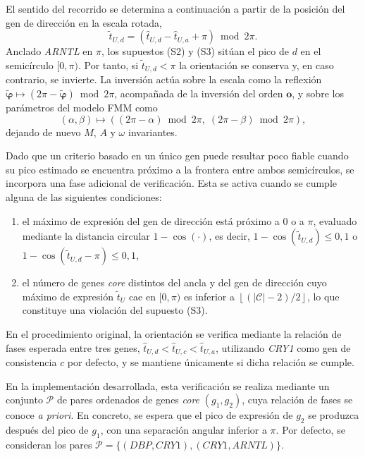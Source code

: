\documentclass[12pt, a4paper]{report}
\begin{document}
El sentido del recorrido se determina a continuación a partir de la posición del gen de dirección en la escala rotada,
\[
\widetilde{t}_{U,d}=\left(\widehat{t}_{U,d}-\widehat{t}_{U,a}+\pi\right)\bmod 2\pi .
\]
Anclado \textit{ARNTL} en \(\pi\), los supuestos (S2) y (S3) sitúan el pico de \(d\) en el semicírculo \([0,\pi)\). Por tanto, si \(\widetilde{t}_{U,d}<\pi\) la orientación se conserva y, en caso contrario, se invierte. La inversión actúa sobre la escala como la reflexión \(\widetilde{\boldsymbol{\varphi}}\mapsto\left(2\pi-\widetilde{\boldsymbol{\varphi}}\right)\bmod 2\pi\), acompañada de la inversión del orden \(\mathbf{o}\), y sobre los parámetros del modelo FMM como
\[
(\alpha,\beta)\longmapsto\left(\left(2\pi-\alpha\right)\bmod 2\pi,\;\left(2\pi-\beta\right)\bmod 2\pi\right),
\]
dejando de nuevo \(M\), \(A\) y \(\omega\) invariantes.

Dado que un criterio basado en un único gen puede resultar poco fiable cuando su pico estimado se encuentra próximo a la frontera entre ambos semicírculos, se incorpora una fase adicional de verificación. Esta se activa cuando se cumple alguna de las siguientes condiciones:

\begin{enumerate}[label=(\roman*), leftmargin=*]
\item el máximo de expresión del gen de dirección está próximo a \(0\) o a \(\pi\), evaluado mediante la distancia circular \(1-\cos(\cdot)\), es decir,
\(1-\cos\left(\widetilde{t}_{U,d}\right)\leq 0{,}1\) o \(1-\cos\left(\widetilde{t}_{U,d}-\pi\right)\leq 0{,}1\),
\item el número de genes \textit{core} distintos del ancla y del gen de dirección cuyo máximo de expresión \(\widetilde{t}_U\) cae en \([0,\pi)\) es inferior a \(\left\lfloor\left(\lvert\mathcal{C}\rvert-2\right)/2\right\rfloor\), lo que constituye una violación del supuesto (S3).
\end{enumerate}

En el procedimiento original, la orientación se verifica mediante la relación de fases esperada entre tres genes, \(\widehat{t}_{U,d}<\widehat{t}_{U,c}<\widehat{t}_{U,a}\), utilizando \textit{CRY1} como gen de consistencia \(c\) por defecto, y se mantiene únicamente si dicha relación se cumple.

En la implementación desarrollada, esta verificación se realiza mediante un conjunto \(\mathcal{P}\) de pares ordenados de genes \textit{core} \((g_1,g_2)\), cuya relación de fases se conoce \textit{a priori}. En concreto, se espera que el pico de expresión de \(g_2\) se produzca después del pico de \(g_1\), con una separación angular inferior a \(\pi\). Por defecto, se consideran los pares \(\mathcal{P}=\{(\textit{DBP},\textit{CRY1}),(\textit{CRY1},\textit{ARNTL})\}\).
\end{document}
